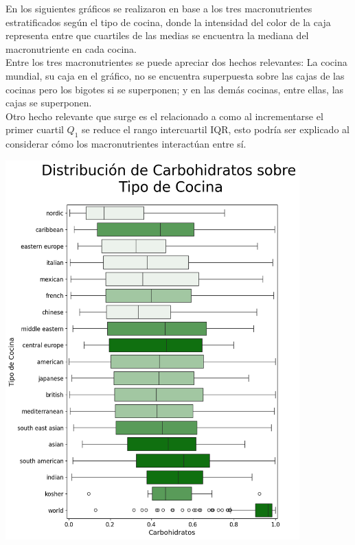 \documentclass[12pt,a4paper]{article}
\begin{document}
        En los siguientes gráficos se realizaron en base a los tres macronutrientes 
        estratificados según el tipo de cocina, donde la intensidad del color de la 
        caja representa entre que cuartiles de las medias se encuentra la mediana 
        del macronutriente en cada cocina.\\

        Entre los tres macronutrientes se puede apreciar dos hechos relevantes: La 
        cocina mundial, su caja en el gráfico, no se encuentra superpuesta sobre las 
        cajas de las cocinas pero los bigotes si se superponen; y en las demás cocinas, 
        entre ellas, las cajas se superponen.\\ 
        
        Otro hecho relevante que surge es el relacionado a como al incrementarse el 
        primer cuartil $Q_1$ se reduce el rango intercuartil IQR, esto podría ser 
        explicado al considerar cómo los macronutrientes interactúan entre sí.\\

        \begin{center}
            \includegraphics[width=0.85\textwidth]{Resources/2_02_plot_02.png}
        \end{center}
\end{document}
